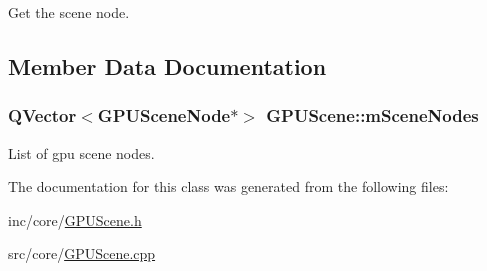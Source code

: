 Get the scene node. 



\subsection{Member Data Documentation}
\hypertarget{class_g_p_u_scene_a73dcf1d581c7c5624274aa0e89f61ae7}{
\subsubsection[{m\+Scene\+Nodes}]{\setlength{\rightskip}{0pt plus 5cm}Q\+Vector$<${\bf G\+P\+U\+Scene\+Node}$\ast$$>$ G\+P\+U\+Scene\+::m\+Scene\+Nodes\hspace{0.3cm}{\ttfamily [private]}}}\label{class_g_p_u_scene_a73dcf1d581c7c5624274aa0e89f61ae7}


List of gpu scene nodes. 



The documentation for this class was generated from the following files\+:\begin{DoxyCompactItemize}
\item 
inc/core/\hyperlink{_g_p_u_scene_8h}{G\+P\+U\+Scene.\+h}\item 
src/core/\hyperlink{_g_p_u_scene_8cpp}{G\+P\+U\+Scene.\+cpp}\end{DoxyCompactItemize}
